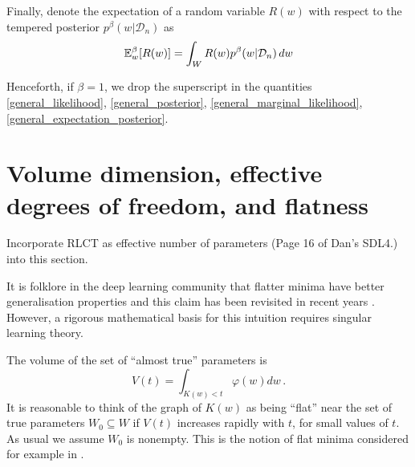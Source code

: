 \documentclass{article} %
\begin{document}
Finally, denote the expectation of a random variable $R(w)$ with respect to the tempered posterior $p^\beta(w|\mathcal D_n)$ as
\begin{equation}
{\mathbb{E}}_w^\beta [R(w)] = \int_W R(w) p^\beta(w|\mathcal D_n) \,dw
\label{general_expectation_posterior}
\end{equation}

Henceforth, if $\beta = 1$, we drop the superscript in the quantities \ref{general_likelihood}, \ref{general_posterior}, \ref{general_marginal_likelihood}, \ref{general_expectation_posterior}.


\section{Volume dimension, effective degrees of freedom, and flatness}
\label{section:no_flat_minima}

Incorporate RLCT as effective number of parameters (Page 16 of Dan's SDL4.) into this section.


It is folklore in the deep learning community that flatter minima have better generalisation properties \citep{hinton1993keeping, hochreiter1997flat} and this claim has been revisited in recent years \citep{chaudhari2019entropy, smith2017bayesian, jastrzkebski2017three, Zhang:2018MolPh.116.3214Z}. However, a rigorous mathematical basis for this intuition requires singular learning theory.

The volume of the set of ``almost true'' parameters is
\[
V(t) = \int_{K(w) < t} \varphi(w) dw\,.
\]
It is reasonable to think of the graph of $K(w)$ as being ``flat'' near the set of true parameters $W_0 \subseteq W$ if $V(t)$ increases rapidly with $t$, for small values of $t$. As usual we assume $W_0$ is nonempty. This is the notion of flat minima considered for example in \citep{hochreiter1997flat}.
\end{document}

